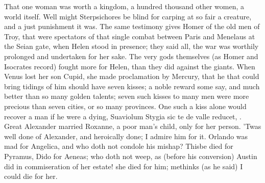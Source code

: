 {That one woman was worth a kingdom, a hundred thousand other women, a
world itself. Well might Sterpsichores be blind for carping at so
fair a creature, and a just punishment it was. The same testimony gives
Homer of the old men of Troy, that were spectators of that single
combat between Paris and Menelaus at the Seian gate, when Helen stood
in presence; they said all, the war was worthily prolonged and
undertaken for her sake. The very gods themselves (as Homer and
Isocrates record) fought more for Helen, than they did against
the giants. When Venus lost her son Cupid, she made proclamation
by Mercury, that he that could bring tidings of him should have seven
kisses; a noble reward some say, and much better than so many golden
talents; seven such kisses to many men were more precious than seven
cities, or so many provinces. One such a kiss alone would recover a man
if he were a dying, Suaviolum Stygia sic te de valle reducet, \etc{}.
Great Alexander married Roxanne, a poor man's child, only for her
person. 'Twas well done of Alexander, and heroically done; I
admire him for it. Orlando was mad for Angelica, and who doth not
condole his mishap? Thisbe died for Pyramus, Dido for Aeneas; who doth
not weep, as (before his conversion) Austin did in commiseration
of her estate! she died for him; methinks (as he said) I could die for
her.

}
